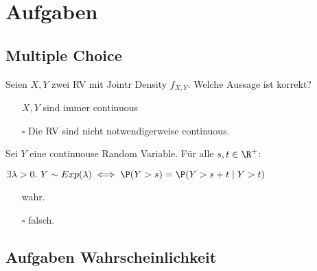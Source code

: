 \section{Aufgaben}
\subsection{Multiple Choice}

Seien \(X,Y\) zwei RV mit Jointr Density \(f_{X,Y}\). Welche Aussage ist korrekt?
\begin{itemize}
	\item[\checkmark] \(X,Y\) sind immer continuous
	\item[\(\square\)] Die RV sind nicht notwendigerweise continuous.
\end{itemize}

Sei $Y$ eine continuouse Random Variable. Für alle $s, t \in \R^+$:

$\exists \lambda > 0. \ Y \sim Exp(\lambda) \iff \P(Y > s) = \P(Y > s + t \mid Y > t)$ 
\begin{itemize}
	\item[\checkmark] wahr.
	\item[\(\square\)] falsch.
\end{itemize}




\subsection{Aufgaben Wahrscheinlichkeit}
